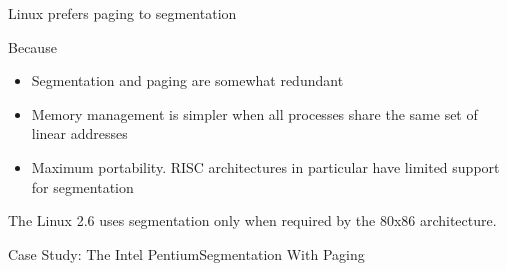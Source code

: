 \begin{frame}{Linux prefers paging to segmentation}
  \begin{block}{Because}
  \begin{itemize}
  \item Segmentation and paging are somewhat redundant
  \item Memory management is simpler when all processes share the same set of linear addresses
  \item Maximum portability. RISC architectures in particular have limited support for segmentation
  \end{itemize}
  \end{block}
  The Linux 2.6 uses segmentation only when required by the 80x86 architecture.
\end{frame}



\begin{frame}{Case Study: The Intel Pentium}{Segmentation With Paging}
  \begin{center}
  \end{center}
  \vspace{1em}
  \begin{minipage}{.3\linewidth}
    \begin{center}
    \end{center}
  \end{minipage}\hfill
  \begin{minipage}{.6\linewidth}
    \begin{center}
    \end{center}
  \end{minipage}
\end{frame}


